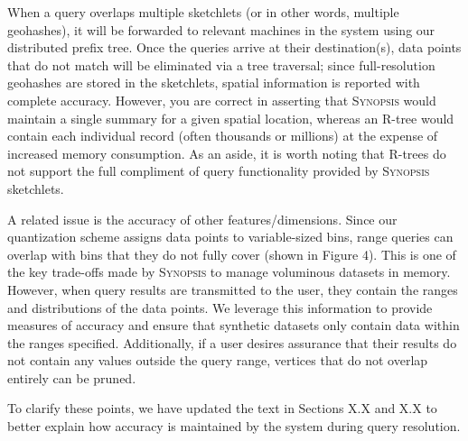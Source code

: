 \documentclass{article}
\begin{document}
\begin{tcolorbox}
    When a query overlaps multiple sketchlets (or in other words, multiple geohashes), it will be forwarded to relevant machines in the system using our distributed prefix tree. Once the queries arrive at their destination(s), data points that do not match will be eliminated via a tree traversal; since full-resolution geohashes are stored in the sketchlets, spatial information is reported with complete accuracy. However, you are correct in asserting that \textsc{Synopsis} would maintain a single summary for a given spatial location, whereas an R-tree would contain each individual record (often thousands or millions) at the expense of increased memory consumption. As an aside, it is worth noting that R-trees do not support the full compliment of query functionality provided by \textsc{Synopsis} sketchlets.

    A related issue is the accuracy of other features/dimensions. Since our quantization scheme assigns data points to variable-sized bins, range queries can overlap with bins that they do not fully cover (shown in Figure 4). This is one of the key trade-offs made by \textsc{Synopsis} to manage voluminous datasets in memory. However, when query results are transmitted to the user, they contain the ranges and distributions of the data points. We leverage this information to provide measures of accuracy and ensure that synthetic datasets only contain data within the ranges specified. Additionally, if a user desires assurance that their results do not contain any values outside the query range, vertices that do not overlap entirely can be pruned.

    To clarify these points, we have updated the text in Sections X.X and X.X to better explain how accuracy is maintained by the system during query resolution.
\end{tcolorbox}
\end{document}
